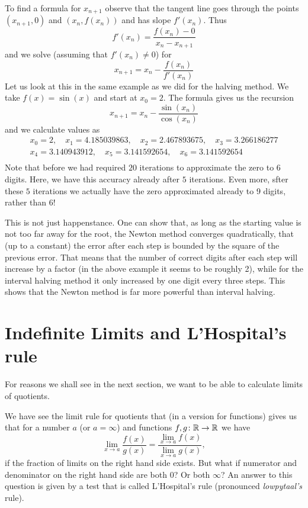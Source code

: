 To find a formula for $x_{n+1}$ observe that the tangent line goes through
the points $(x_{n+1},0)$ and $(x_n,f(x_n))$ and has slope $f'(x_n)$. Thus
\[
f'(x_n)=\frac{f(x_n)-0}{x_n-x_{n+1}}
\]
and we solve (assuming that $f'(x_n)\not=0$) for
\[
x_{n+1}=x_n-\frac{f(x_n)}{f'(x_n)}
\]
Let us look at this in the same example as we did for the halving method. We
take $f(x)=\sin(x)$ and start at $x_0=2$. The formula gives us the recursion
\[
x_{n+1}=x_n-\frac{\sin(x_n)}{\cos(x_n)}
\]
and we calculate values as
\begin{eqnarray*}
&x_0=2, \quad x_1=4.185039863,\quad x_2=2.467893675, \quad x_3=3.266186277&\\
&x_4=3.140943912, \quad x_5=3.141592654,\quad x_6=3.141592654&\\
\end{eqnarray*}
Note that before we had required $20$ iterations to approximate the zero to
$6$ digits. Here, we have this accuracy already after $5$ iterations. Even
more, sfter these $5$ iterations we actually have the zero approximated
already to 9 digits, rather than $6$!

This is not just happenstance. One can show that, as long as the starting
value is not too far away for the root, the Newton method converges
quadratically, that (up to a constant) the error after each step is bounded
by the square of the previous error. That means that the number of correct
digits after each step will increase by a factor (in the above example it
seems to be roughly 2), while for the interval halving method it only
increased by one digit every three steps. This shows that the Newton
method is far more powerful than interval halving.

\section{Indefinite Limits and L'Hospital's rule}
\label{seclhopital}

For reasons we shall see in the next section, we want to be able to
calculate limits of quotients.

We have see the limit rule for quotients that (in a version for
functions) gives us that for a number $a$ (or $a=\infty$) and functions
$f,g\colon{\mathbb R}\to{\mathbb R}$ we have
\[
\lim_{x\to a}\frac{f(x)}{g(x)}=\frac{\lim_{x\to a}f(x)}{\lim_{x\to a}g(x)},
\]
if the fraction of limits on the right hand side exists. But what if
numerator and denominator on the right hand side are both $0$? Or both
$\infty$? An answer to this question is given by a test that is
called
L'Hospital's rule (pronounced {\em lowpytaal's} rule).

